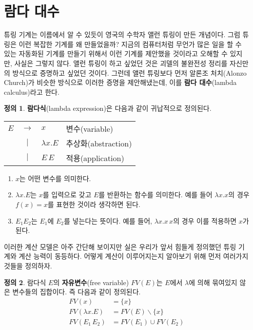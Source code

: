 \documentclass[b5paper, 10pt]{book}
\theoremstyle{definition}
\newtheorem{defn}{정의}[chapter]
\begin{document}
\section{람다 대수} \label{lambda calculus}
튜링 기계는 이름에서 알 수 있듯이 영국의 수학자 앨런 튜링이 만든 개념이다. 그럼 튜링은 이런 복잡한 기계를
왜 만들었을까? 지금의 컴퓨터처럼 무언가 많은 일을 할 수 있는 자동화된 기계를 만들기 위해서 이런 기계를 
제안했을 것이라고 오해할 수 있지만, 사실은 그렇지 않다. 앨런 튜링이 하고 싶었던 것은 괴델의 불완전성 
정리를 자신만의 방식으로 증명하고 싶었던 것이다.
그런데 앨런 튜링보다 먼저 알론조 처치(Alonzo Church)가 비슷한 방식으로 이러한 증명을 제안해냈는데, 이를 
\textbf{람다 대수}(lambda calculus)라고 한다. 
\begin{defn}
    \textbf{람다식}(lambda expression)은 다음과 같이 귀납적으로 정의된다.
    \begin{center}
        \begin{tabular}{ccll}
            $E$ & $\rightarrow$ & $x$ & 변수(variable) \\ 
            & $\vert$ & $\lambda x . E$ & 추상화(abstraction) \\ 
            & $\vert$ & $E \, E$ & 적용(application)
        \end{tabular}    
    \end{center}
    \begin{enumerate}
        \item $x$는 어떤 변수를 의미한다.
        \item $\lambda x. E$는 $x$를 입력으로 갖고 $E$를 반환하는 함수를 의미한다. 예를 들어
        $\lambda x . x$의 경우 $f(x) = x$를 표현한 것이라 생각하면 된다.
        \item $E_1 E_2$는 $E_1$에 $E_2$를 넣는다는 뜻이다. 예를 들어, $\lambda x. x \, x$의 경우
        이를 적용하면 $x$가 된다.
    \end{enumerate} 
\end{defn}
이러한 계산 모델은 아주 간단해 보이지만 실은 우리가 앞서 힘들게 정의했던 튜링 기계와 계산 능력이
동등하다. 어떻게 계산이 이루어지는지 알아보기 위해 먼저 여러가지 것들을 정의하자.
\begin{defn}
    람다식 $E$의 \textbf{자유변수}(free variable) $FV(E)$는 $E$에서 $\lambda$에 의해 묶여있지 않은
    변수들의 집합이다. 즉 다음과 같이 정의된다.
    \begin{align*}
        FV(x) &= \{ x \} \\ 
        FV(\lambda x. E) &= FV(E) \backslash \{x\} \\ 
        FV(E_1 \, E_2) &= FV(E_1) \cup FV(E_2) 
    \end{align*}
\end{defn}
\end{document}
